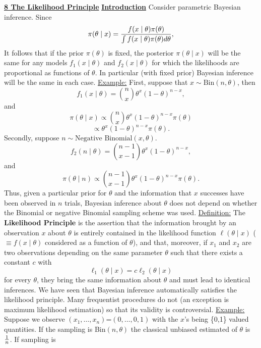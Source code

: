 
\def \baselinestretch{1.2}
\def\ni{\noindent}
\textwidth=18.0cm
\topmargin=-1.2cm
\columnsep=1.0cm
\textheight=21.8cm
\hoffset=-1.9cm


\normalsize
\ni\underline{\large {\bf 8 The Likelihood Principle}}
\vskip 8mm
\ni\underline{\bf Introduction}
\vskip 4mm
Consider parametric Bayesian inference.  Since
$$\pi(\theta \mid x) = {f(x\mid \theta) \pi(\theta) \over
\int f(x\mid \theta) \pi(\theta) d\theta},$$
It follows that if the prior $\pi(\theta)$ is fixed, the posterior
$\pi(\theta\mid x)$ will be the same for any models 
$f_1 (x\mid \theta)$ and $f_2 (x\mid \theta)$ for which the
likelihoods are proportional as functions of $\theta$.  In particular
(with fixed prior) Bayesian inference will be the same in each case.
\vskip 4mm
\ni\underline{Example:} First, suppose that $x\sim \mbox{Bin}(n,\theta)$, then
$$f_1(x\mid \theta) = {n \choose x} \theta^x (1-\theta)^{n-x},$$
and
$$\pi(\theta \mid x) \propto {n \choose x} \theta^x (1-\theta)^{n-x}
\pi(\theta)$$
$$\propto \theta^x (1-\theta)^{n-x} \pi(\theta).$$
Secondly, suppose $n\sim \mbox{Negative Binomial}(x,\theta)$.
$$f_2(n\mid \theta) = {n-1 \choose x-1} \theta^x (1-\theta)^{n-x},$$
and
$$\pi(\theta \mid n) \propto {n-1 \choose x-1} \theta^x (1-\theta)^{n-x}
\pi(\theta).$$
Thus, given a particular prior for $\theta$ and the information that $x$
successes have been observed in $n$ trials, Bayesian inference about
$\theta$ does not depend on whether the Binomial or negative Binomial
sampling scheme was used. 
\vskip 4mm
\ni\underline{Definition:} The {\bf Likelihood Principle} is the
assertion that the information brought by an observation $x$ about
$\theta$ is entirely contained in the likelihood function 
$\ell (\theta \mid x)$ ($\equiv f(x\mid \theta)$ considered as a
function of $\theta$), and that, moreover, if $x_1$ and $x_2$ are two
observations depending on the same parameter $\theta$ such that there
exists a constant $c$ with
$$\ell_1 (\theta \mid x) = c\ell_2 (\theta \mid x)$$
for every $\theta$, they bring the same information about $\theta$ and
must lead to identical inferences. 
\vskip 4mm
We have seen that Bayesian inference automatically satisfies the
likelihood principle.  Many frequentist procedures do not (an
exception is maximum likelihood estimation) so that its validity is
controversial.
\vskip 4mm
\ni\underline{Example:}  Suppose we observe
$(x_1,\ldots,x_n)$=$(0,\ldots,0,1)$ with the $x$'s being \{0,1\} valued
quantities.  If the sampling is Bin$(n,\theta)$ the classical unbiased
estimated of $\theta$ is ${1\over n}$.  If sampling is
